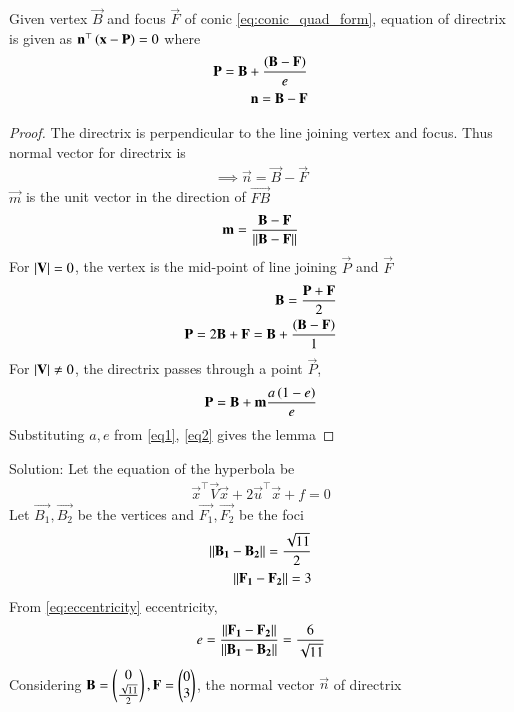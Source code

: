 \documentclass[journal,12pt,twocolumn]{IEEEtran}
\begin{document}
\begin{lemma}
Given vertex $\vec{B}$ and focus $\vec{F}$ of conic \eqref{eq:conic_quad_form}, equation of directrix is given as $\mathbf{n}^{\top}\left(\mathbf{x} - \mathbf{P}\right) = 0$ where
\begin{align}
    \mathbf{P} = \mathbf{B} + \frac{\left(\mathbf{B}-\mathbf{F}\right)}{e}\\
    \mathbf{n} = \mathbf{B}-\mathbf{F}
\end{align}
\end{lemma}
\begin{proof}
The directrix is perpendicular to the line joining vertex and focus. Thus normal vector for directrix is
\begin{align}
    \implies \vec{n} = \vec{B}-\vec{F}
\end{align}
$\vec{m}$ is the unit vector in the direction of $\vec{FB}$
\begin{align}
    \mathbf{m} = \frac{\mathbf{B}-\mathbf{F}}{\lVert\mathbf{B}-\mathbf{F}\rVert}
\end{align}
For $\vert\mathbf{V}\vert = 0$, the vertex is the mid-point of line joining $\vec{P}$ and $\vec{F}$
\begin{align}
    \mathbf{B} = \frac{\mathbf{P}+\mathbf{F}}{2}\\
    \mathbf{P} = 2\mathbf{B} + \mathbf{F} = \mathbf{B} + \frac{\left(\mathbf{B}-\mathbf{F}\right)}{1}
\end{align}
For $\vert\mathbf{V}\vert \ne 0$, the directrix passes through a point $\vec{P}$,
\begin{align}
    \mathbf{P} = \mathbf{B} + \mathbf{m}\frac{a\left(1-e\right)}{e}
\end{align}
Substituting $a,e$ from \eqref{eq1}, \eqref{eq2} gives the lemma
\end{proof}
Solution: Let the equation of the hyperbola be
\begin{align}
     \vec{x}^{\top}\vec{V}\vec{x}+2\vec{u}^{\top}\vec{x}+f=0
\end{align}
Let $\vec{B_1}, \vec{B_2}$ be the vertices and $\vec{F_1}, \vec{F_2}$ be the foci
\begin{align}
    \lVert\mathbf{B_1}-\mathbf{B_2}\rVert = \frac{\sqrt{11}}{2}\\
    \lVert\mathbf{F_1}-\mathbf{F_2}\rVert = 3
\end{align}
From \eqref{eq:eccentricity} eccentricity,
\begin{align}
    e = \frac{\lVert\mathbf{F_1}-\mathbf{F_2}\rVert}{\lVert\mathbf{B_1}-\mathbf{B_2}\rVert} = \frac{6}{\sqrt{11}} 
\end{align}
Considering $\mathbf{B} = \begin{pmatrix}0\\\frac{\sqrt{11}}{2}\end{pmatrix}, \mathbf{F} = \begin{pmatrix}0\\3\end{pmatrix}$, the normal vector $\vec{n}$ of directrix
\end{document}
